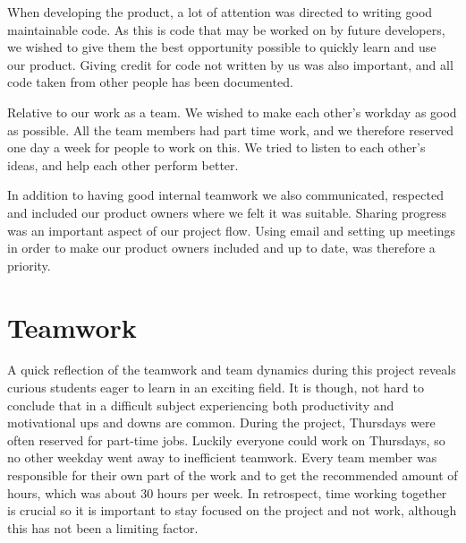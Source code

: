 When developing the product, a lot of attention was directed to writing good maintainable code. As this is code that may be worked on by future developers, we wished to give them the best opportunity possible to quickly learn and use our product. Giving credit for code not written by us was also important, and all code taken from other people has been documented. 

Relative to our work as a team. We wished to make each other's workday as good as possible. All the team members had part time work, and we therefore reserved one day a week for people to work on this. We tried to listen to each other's ideas, and help each other perform better.

In addition to having good internal teamwork we also communicated, respected and included our product owners where we felt it was suitable. Sharing progress was an important aspect of our project flow. Using email and setting up meetings in order to make our product owners included and up to date, was therefore a priority.

\section{Teamwork}
A quick reflection of the teamwork and team dynamics during this project reveals curious students eager to learn in an exciting field. It is though, not hard to conclude that in a difficult subject experiencing both productivity and motivational ups and downs are common. During the project, Thursdays were often reserved for part-time jobs. Luckily everyone could work on Thursdays, so no other weekday went away to inefficient teamwork. Every team member was responsible for their own part of the work and to get the recommended amount of hours, which was about 30 hours per week. In retrospect, time working together is crucial so it is important to stay focused on the project and not work, although this has not been a limiting factor.